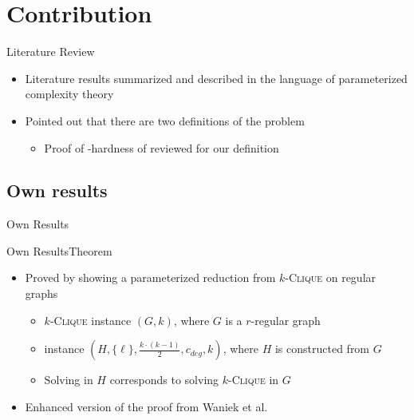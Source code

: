 \section{Contribution}

\begin{frame}{Literature Review}
    \begin{itemize}
        \item Literature results summarized and described in the language of parameterized complexity theory
        \item Pointed out that there are two definitions of the problem
        \begin{itemize}
            \item Proof of \NP-hardness of \HLdeg reviewed for our definition 
        \end{itemize}
    \end{itemize}
\end{frame}

\subsection
{Own results}

\begin{frame}{Own Results}
    
\end{frame}

\begin{frame}{Own Results}{Theorem}
    \begin{center}
    \end{center}

    \begin{itemize}
        \item Proved by showing a parameterized reduction from $k$-\textsc{Clique} on regular graphs
        \begin{itemize}
            \item $k$-\textsc{Clique} instance $(G, k)$, where $G$ is a $r$-regular graph
            \item \HL instance $(H, \{\ell\}, \frac{k\cdot(k-1)}{2}, c_{deg}, k)$, where $H$ is constructed from $G$
            \item Solving \HL in $H$ corresponds to solving $k$-\textsc{Clique} in $G$
        \end{itemize}
        \item Enhanced version of the proof from Waniek et al.
    \end{itemize}
\end{frame}

